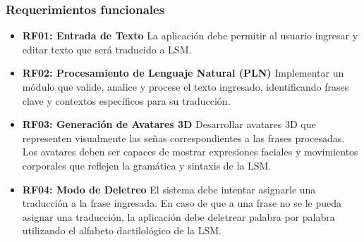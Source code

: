\subsubsection{Requerimientos funcionales}
\begin{itemize}
    \item \textbf{RF01: Entrada de Texto}  
    La aplicación debe permitir al usuario ingresar y editar texto que será traducido a LSM.
    
    \item \textbf{RF02: Procesamiento de Lenguaje Natural (PLN)}  
    Implementar un módulo que valide, analice y procese el texto ingresado, identificando frases clave y contextos específicos para su traducción.
    
    \item \textbf{RF03: Generación de Avatares 3D}  
    Desarrollar avatares 3D que representen visualmente las señas correspondientes a las frases procesadas. Los avatares deben ser capaces de mostrar expresiones faciales y movimientos corporales que reflejen la gramática y sintaxis de la LSM. 
    
    \item \textbf{RF04: Modo de Deletreo}  
    El sistema debe intentar asignarle una traducción a la frase ingresada. En caso de que a una frase no se le pueda asignar una traducción, la aplicación debe deletrear palabra por palabra utilizando el alfabeto dactilológico de la LSM.
    
    
\end{itemize}


